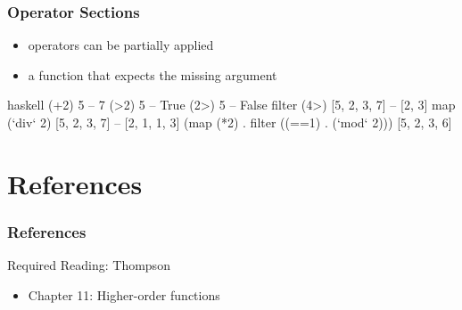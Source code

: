\documentclass[dvipsnames]{beamer}
\theoremstyle{plain}
\begin{document}
\begin{frame}[fragile]
  \frametitle{Operator Sections}

  \begin{itemize}
    \item operators can be partially applied
    \item a function that expects the missing argument
  \end{itemize}

  \begin{exampleblock}{}
    \begin{pygments}{haskell}
(+2) 5                      -- 7
(>2) 5                      -- True
(2>) 5                      -- False
filter (4>) [5, 2, 3, 7]    -- [2, 3]
map (`div` 2) [5, 2, 3, 7]  -- [2, 1, 1, 3]
(map (*2) . filter ((==1) . (`mod` 2))) [5, 2, 3, 6]
    \end{pygments}
  \end{exampleblock}
\end{frame}


%
%
%

\section*{References}

\begin{frame}
  \frametitle{References}

  \begin{block}{Required Reading: Thompson}
    \begin{itemize}
      \item Chapter 11: \alert{Higher-order functions}
    \end{itemize}
  \end{block}
\end{frame}
\end{document}
